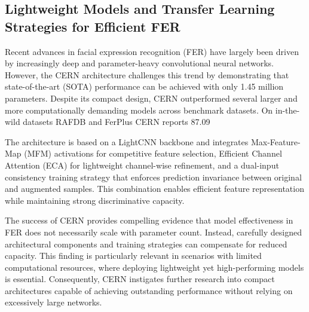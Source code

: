 \subsection{Lightweight Models and Transfer Learning Strategies for Efficient FER}

Recent advances in facial expression recognition (FER) have largely been driven by increasingly deep and parameter-heavy convolutional neural networks. However, the CERN \cite{GERA20229} architecture challenges this trend by demonstrating that state-of-the-art (SOTA) performance can be achieved with only 1.45 million parameters. Despite its compact design, CERN outperformed several larger and more computationally demanding models across benchmark datasets. On in-the-wild datasets RAFDB and FerPlus CERN reports 87.09%

The architecture is based on a LightCNN backbone and integrates Max-Feature-Map (MFM) activations for competitive feature selection, Efficient Channel Attention (ECA) for lightweight channel-wise refinement, and a dual-input consistency training strategy that enforces prediction invariance between original and augmented samples. This combination enables efficient feature representation while maintaining strong discriminative capacity.

The success of CERN provides compelling evidence that model effectiveness in FER does not necessarily scale with parameter count. Instead, carefully designed architectural components and training strategies can compensate for reduced capacity. This finding is particularly relevant in scenarios with limited computational resources, where deploying lightweight yet high-performing models is essential. Consequently, CERN instigates further research into compact architectures capable of achieving outstanding performance without relying on excessively large networks.


